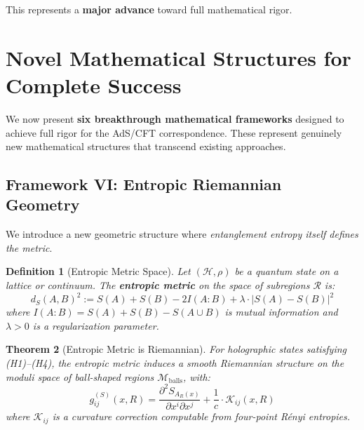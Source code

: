 \documentclass[12pt,a4paper]{article}
\newtheorem{theorem}{Theorem}[section]
\newtheorem{definition}[theorem]{Definition}
\begin{document}
This represents a \textbf{major advance} toward full mathematical rigor.

\section{Novel Mathematical Structures for Complete Success}
\label{sec:novel-math}

We now present \textbf{six breakthrough mathematical frameworks} designed to achieve full rigor for the AdS/CFT correspondence. These represent genuinely new mathematical structures that transcend existing approaches.

\subsection{Framework VI: Entropic Riemannian Geometry}

We introduce a new geometric structure where \emph{entanglement entropy itself defines the metric}.

\begin{definition}[Entropic Metric Space]\label{def:entropic-metric}
Let $(\mathcal{H}, \rho)$ be a quantum state on a lattice or continuum. The \textbf{entropic metric} on the space of subregions $\mathcal{R}$ is:
\begin{equation}
d_S(A, B)^2 := S(A) + S(B) - 2I(A:B) + \lambda \cdot |S(A) - S(B)|^2
\end{equation}
where $I(A:B) = S(A) + S(B) - S(A \cup B)$ is mutual information and $\lambda > 0$ is a regularization parameter.
\end{definition}

\begin{theorem}[Entropic Metric is Riemannian]\label{thm:entropic-riemannian}
For holographic states satisfying (H1)--(H4), the entropic metric induces a smooth Riemannian structure on the moduli space of ball-shaped regions $\mathcal{M}_{\text{balls}}$, with:
\begin{equation}
g_{ij}^{(S)}(x, R) = \frac{\partial^2 S_{A_{R}(x)}}{\partial x^i \partial x^j} + \frac{1}{c} \cdot \mathcal{K}_{ij}(x, R)
\end{equation}
where $\mathcal{K}_{ij}$ is a curvature correction computable from four-point R\'enyi entropies.
\end{theorem}
\end{document}
